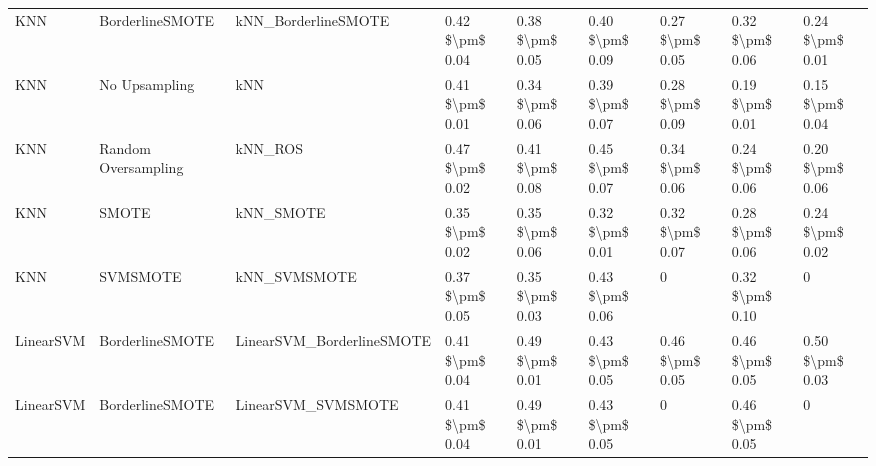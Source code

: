 \begin{tabular}{lllllllll}
                            KNN &               BorderlineSMOTE &                          kNN\_BorderlineSMOTE & 0.42 \$\textbackslash pm\$ 0.04 &           0.38 \$\textbackslash pm\$ 0.05 &       0.40 \$\textbackslash pm\$ 0.09 &        0.27 \$\textbackslash pm\$ 0.05 &                         0.32 \$\textbackslash pm\$ 0.06 &     0.24 \$\textbackslash pm\$ 0.01 \\
                            KNN &                 No Upsampling &                                          kNN & 0.41 \$\textbackslash pm\$ 0.01 &           0.34 \$\textbackslash pm\$ 0.06 &       0.39 \$\textbackslash pm\$ 0.07 &        0.28 \$\textbackslash pm\$ 0.09 &                         0.19 \$\textbackslash pm\$ 0.01 &     0.15 \$\textbackslash pm\$ 0.04 \\
                            KNN &           Random Oversampling &                                      kNN\_ROS & 0.47 \$\textbackslash pm\$ 0.02 &           0.41 \$\textbackslash pm\$ 0.08 &       0.45 \$\textbackslash pm\$ 0.07 &        0.34 \$\textbackslash pm\$ 0.06 &                         0.24 \$\textbackslash pm\$ 0.06 &     0.20 \$\textbackslash pm\$ 0.06 \\
                            KNN &                         SMOTE &                                    kNN\_SMOTE & 0.35 \$\textbackslash pm\$ 0.02 &           0.35 \$\textbackslash pm\$ 0.06 &       0.32 \$\textbackslash pm\$ 0.01 &        0.32 \$\textbackslash pm\$ 0.07 &                         0.28 \$\textbackslash pm\$ 0.06 &     0.24 \$\textbackslash pm\$ 0.02 \\
                            KNN &                      SVMSMOTE &                                 kNN\_SVMSMOTE & 0.37 \$\textbackslash pm\$ 0.05 &           0.35 \$\textbackslash pm\$ 0.03 &       0.43 \$\textbackslash pm\$ 0.06 &                      0 &                         0.32 \$\textbackslash pm\$ 0.10 &                   0 \\
                      LinearSVM &               BorderlineSMOTE &                    LinearSVM\_BorderlineSMOTE & 0.41 \$\textbackslash pm\$ 0.04 &           0.49 \$\textbackslash pm\$ 0.01 &       0.43 \$\textbackslash pm\$ 0.05 &        0.46 \$\textbackslash pm\$ 0.05 &                         0.46 \$\textbackslash pm\$ 0.05 &     0.50 \$\textbackslash pm\$ 0.03 \\
                      LinearSVM &               BorderlineSMOTE &                           LinearSVM\_SVMSMOTE & 0.41 \$\textbackslash pm\$ 0.04 &           0.49 \$\textbackslash pm\$ 0.01 &       0.43 \$\textbackslash pm\$ 0.05 &                      0 &                         0.46 \$\textbackslash pm\$ 0.05 &                   0 \\

\end{tabular}
